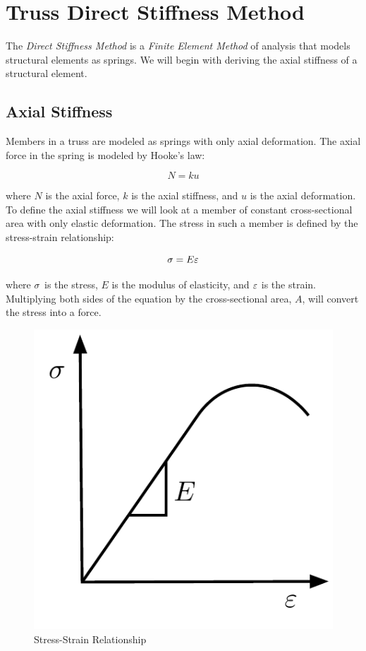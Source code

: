 \section{Truss Direct Stiffness Method}



The \textit{Direct Stiffness Method} is a \textit{Finite Element Method} of analysis that models structural elements as springs. We will begin with deriving the axial stiffness of a structural element.

\subsection{Axial Stiffness}
Members in a truss are modeled as springs with only axial deformation. The axial force in the spring is modeled by Hooke's law:

\begin{equation}
	N = k u
\end{equation}

where $N$ is the axial force, $k$ is the axial stiffness, and $u$ is the axial deformation. To define the axial stiffness we will look at a member of constant cross-sectional area with only elastic deformation. The stress in such a member is defined by the stress-strain relationship:

\begin{equation}
	\sigma = E \varepsilon
\end{equation}

where $\sigma$ is the stress, $E$ is the modulus of elasticity, and $\varepsilon$ is the strain. Multiplying both sides of the equation by the cross-sectional area, $A$, will convert the stress into a force.

\begin{figure}[h]	\centerline{\includegraphics[width=0.5\columnwidth]{Figures/Stress-Strain}}
	\caption{Stress-Strain Relationship}
	\label{fig:Stress-Strain}
\end{figure}

